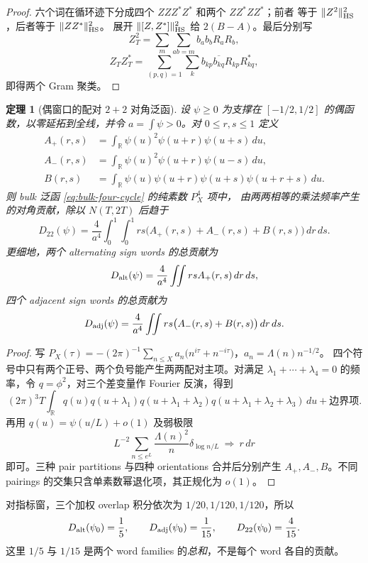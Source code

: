 \documentclass[UTF8,11pt,a4paper]{ctexart}
\newtheorem{theorem}{定理}[section]
\theoremstyle{definition}
\theoremstyle{remark}
\begin{document}
\begin{proof}
六个词在循环迹下分成四个 $ZZZ^*Z^*$ 和两个 $ZZ^*ZZ^*$；前者
等于 $\|Z^2\|_{\rm HS}^2$，后者等于 $\|ZZ^*\|_{\rm HS}^2$。
展开 $\|[Z,Z^*]\|_{\rm HS}^2$ 给 $2(B-A)$。最后分别写
\[
 Z_T^2=\sum_m\sum_{ab=m}b_ab_bR_aR_b,
\]
\[
 Z_TZ_T^*=\sum_{(p,q)=1}\sum_k
 b_{kp}\overline{b_{kq}}R_{kp}R_{kq}^*,
\]
即得两个 Gram 聚类。
\end{proof}

\begin{theorem}[偶窗口的配对 $2+2$ 对角泛函]
\label{thm:paired-window}
设 $\psi\ge0$ 为支撑在 $[-1/2,1/2]$ 的偶函数，以零延拓到全线，并令
$a=\int\psi>0$。对 $0\le r,s\le1$ 定义
\begin{align*}
 A_+(r,s)&=\int_{\mathbb R}\psi(u)^2\psi(u+r)\psi(u+s)\,du,\\
 A_-(r,s)&=\int_{\mathbb R}\psi(u)^2\psi(u+r)\psi(u-s)\,du,\\
 B(r,s)&=\int_{\mathbb R}\psi(u)\psi(u+r)\psi(u+s)\psi(u+r+s)\,du.
\end{align*}
则 bulk 泛函 \eqref{eq:bulk-four-cycle} 的纯素数 $P_X^4$ 项中，
由两两相等的乘法频率产生的对角贡献，除以 $N(T,2T)$ 后趋于
\[
 D_{22}(\psi)
 =\frac4{a^4}\int_0^1\!\!\int_0^1
 rs\bigl(A_+(r,s)+A_-(r,s)+B(r,s)\bigr)\,dr\,ds.
 \label{eq:paired-window-functional}
\]
更细地，两个 alternating sign words 的总贡献为
\[
 D_{\rm alt}(\psi)=\frac4{a^4}\iint rsA_+(r,s)\,dr\,ds,
\]
四个 adjacent sign words 的总贡献为
\[
 D_{\rm adj}(\psi)=\frac4{a^4}\iint
 rs\bigl(A_-(r,s)+B(r,s)\bigr)\,dr\,ds.
\]
\end{theorem}

\begin{proof}
写
$P_X(\tau)=-(2\pi)^{-1}\sum_{n\le X}a_n
\bigl(n^{i\tau}+n^{-i\tau}\bigr)$，$a_n=\Lambda(n)n^{-1/2}$。
四个符号中只有两个正号、两个负号能产生两两配对主项。对满足
$\lambda_1+\cdots+\lambda_4=0$ 的频率，令
$q=\phi^2$，对三个差变量作 Fourier 反演，得到
\[
 (2\pi)^3T\int_{\mathbb R}
 q(u)q(u+\lambda_1)q(u+\lambda_1+\lambda_2)
 q(u+\lambda_1+\lambda_2+\lambda_3)\,du
+\text{边界项}.
\]
再用 $q(u)=\psi(u/L)+o(1)$ 及弱极限
\[
 L^{-2}\sum_{n\le e^L}\frac{\Lambda(n)^2}{n}
 \delta_{\log n/L}\ \Longrightarrow\ r\,dr
\]
即可。三种 pair partitions 与四种 orientations 合并后分别产生
$A_+,A_-,B$。不同 pairings 的交集只含单素数幂退化项，其正规化为
$o(1)$。
\end{proof}

对指标窗，三个加权 overlap 积分依次为
$1/20,1/120,1/120$，所以
\[
 D_{\rm alt}(\psi_0)=\frac15,\qquad
 D_{\rm adj}(\psi_0)=\frac1{15},\qquad
 D_{22}(\psi_0)=\frac4{15}.
\]
这里 $1/5$ 与 $1/15$ 是两个 word families 的\emph{总和}，不是每个 word
各自的贡献。
\end{document}
